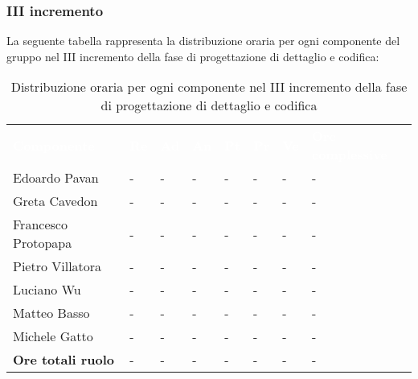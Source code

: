 \subsubsection{III incremento}
La seguente tabella rappresenta la distribuzione oraria per ogni componente del gruppo nel III incremento della fase di progettazione di dettaglio e codifica:
\begin{table}[!htbp]
\begin{center}
\renewcommand{\arraystretch}{1.25}
\begin{tabular}{ m{}<{\centering}  m{}<{\centering} m{}<{\centering} m{}<{\centering}  m{}<{\centering}  m{}<{\centering}  m{}<{\centering}  m{}<{\centering}   }
	\rowcolor{darkblue}
	\textcolor{white}{\textbf{Componente}} &\textcolor{white}{\textbf{Re}}&\textcolor{white}{\textbf{Ad}}&\textcolor{white}{\textbf{An}}&\textcolor{white}{\textbf{Pt}}&\textcolor{white}{\textbf{Pr}}&\textcolor{white}{\textbf{Ve}}&\textcolor{white}{\textbf{Ore complessive}}\\ 

	Edoardo Pavan & - & - & - & - & - & - & -\\	

	\rowcolor{gray!10} Greta Cavedon & - & - & - & - & - & - & -\\
	
	Francesco Protopapa & - & - & - & - & - & - & -\\
	
	\rowcolor{gray!10} Pietro Villatora & - & - & - & - & - & - & -\\
	
	Luciano Wu & - & - & - & - & - & - & -\\
	
	\rowcolor{gray!10} Matteo Basso & - & - & - & - & - & - & -\\
	
	Michele Gatto & - & - & - & - & - & - & -\\
	
	\rowcolor{gray!10} \textbf{Ore totali ruolo} & - & - & - & - & - & - & -\\

\end{tabular}
\caption{Distribuzione oraria per ogni componente nel III incremento della fase di progettazione di dettaglio e codifica}
\end{center}
\end{table}


